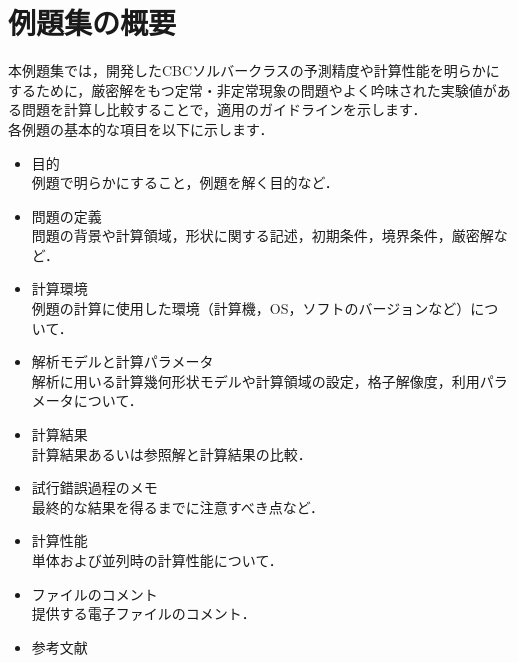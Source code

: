 

\section{例題集の概要}

本例題集では，開発したCBCソルバークラスの予測精度や計算性能を明らかにするために，厳密解をもつ定常・非定常現象の問題やよく吟味された実験値がある問題を計算し比較することで，適用のガイドラインを示します．\\

各例題の基本的な項目を以下に示します．

\begin{itemize}
\item 目的\\
例題で明らかにすること，例題を解く目的など．
\vspace{3mm}

\item 問題の定義\\
問題の背景や計算領域，形状に関する記述，初期条件，境界条件，厳密解など．
\vspace{3mm}

\item 計算環境\\
例題の計算に使用した環境（計算機，OS，ソフトのバージョンなど）について．
\vspace{3mm}

\item 解析モデルと計算パラメータ\\
解析に用いる計算幾何形状モデルや計算領域の設定，格子解像度，利用パラメータについて．
\vspace{3mm}

\item 計算結果\\
計算結果あるいは参照解と計算結果の比較．
\vspace{3mm}

\item 試行錯誤過程のメモ\\
最終的な結果を得るまでに注意すべき点など．
\vspace{3mm}

\item 計算性能\\
単体および並列時の計算性能について．
\vspace{3mm}

\item ファイルのコメント\\
提供する電子ファイルのコメント．
\vspace{3mm}

\item 参考文献\\

\end{itemize}


